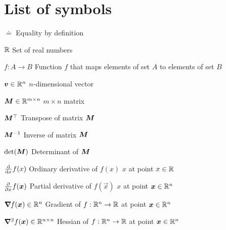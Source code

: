 \section*{List of symbols}

\vspace{10mm}

\begin{abbrv}
    \item[$\doteq$] Equality by definition
    \item[$\mathbb{R}$] Set of real numbers
    \item[$f: A \to B$] Function $f$ that maps elements of set $A$ to elements of set $B$

    \item

    \item[$\bm{v} \in \mathbb{R}^n$] $n$-dimensional vector
    \item[$\bm{M} \in \mathbb{R}^{m\times n}$] $m \times n$ matrix
    \item[$\bm{M}^\top$] Transpose of matrix $\bm{M}$
    \item[$\bm{M}^{-1}$] Inverse of matrix $\bm{M}$
    \item[$\det{\mat{M}}$] Determinant of $\bm{M}$

    \item

    \item[$\odv*{f(x)}{x}$] Ordinary derivative of $f(x)$ \wrt $x$ at point $x\in\mathbb{R}$
    \item[$\pdv*{f(\bm{x})}{x}$] Partial derivative of $f(\vec{x})$ \wrt $x$ at point $\bm{x}\in\mathbb{R}^n$
    \item[$\bm{\nabla}_{\! } f(\bm{x}) \in \mathbb{R}^n$] Gradient of $f: \mathbb{R}^n \to \mathbb{R}$ at point $\bm{x}\in\mathbb{R}^n$
    \item[$\bm{\nabla}^2_{\! } f(\bm{x}) \in \mathbb{R}^{n\times n}$] Hessian of $f: \mathbb{R}^n \to \mathbb{R}$ at point $\bm{x}\in\mathbb{R}^n$
\end{abbrv}

